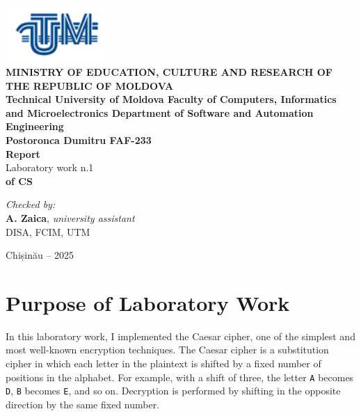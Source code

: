 \documentclass[12pt]{article}
\begin{document}
\begin{titlepage}
\begin{center}
    \includegraphics[width=0.3\textwidth]{image.png} \\[0.2cm]
    
    \textbf{MINISTRY OF EDUCATION, CULTURE AND RESEARCH 
OF THE REPUBLIC OF MOLDOVA} \\[0.3cm]
    
    \textbf{Technical University of Moldova 
Faculty of Computers, Informatics and Microelectronics 
Department of Software and Automation Engineering} \\[2cm]
    
    \textbf{Postoronca Dumitru FAF-233}\\[0.5cm]
    
    \Huge \textbf{Report} \\[0.5cm]
    
    \large Laboratory work n.1 \\[0.5cm]
    
    \textbf{of CS} \\[3cm]
    
    \begin{flushright}
        \textit{Checked by:} \\
        \textbf{A. Zaica}, \textit{university assistant} \\
        DISA, FCIM, UTM
    \end{flushright}
    
    \vfill
    
    Chișinău -- 2025
\end{center}
\end{titlepage}


\newpage
\setcounter{page}{1}
\pagestyle{fancy}
\fancyhf{}
\rhead{\thepage}

\section*{Purpose of Laboratory Work}
\hspace{0.8cm} 

In this laboratory work, I implemented the Caesar cipher, one of the simplest and most well-known 
encryption techniques. The Caesar cipher is a substitution cipher in which each letter in the plaintext 
is shifted by a fixed number of positions in the alphabet. For example, with a shift of three, the letter 
\texttt{A} becomes \texttt{D}, \texttt{B} becomes \texttt{E}, and so on. Decryption is performed by shifting 
in the opposite direction by the same fixed number.
\end{document}
